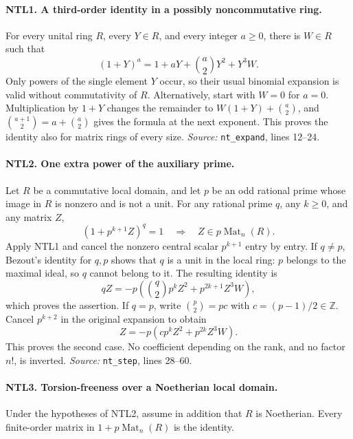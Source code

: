 \paragraph{NTL1. A third-order identity in a possibly noncommutative ring.}
\label{claim:NTL1}
For every unital ring \(R\), every \(Y\in R\), and every integer
\(a\ge0\), there is \(W\in R\) such that
\begin{equation}\label{eq:ntl-expand}
 (1+Y)^a=1+aY+\binom a2Y^2+Y^3W.
\end{equation}
Only powers of the single element \(Y\) occur, so their usual binomial
expansion is valid without commutativity of \(R\).  Alternatively,
start with \(W=0\) for \(a=0\).  Multiplication by \(1+Y\) changes the
remainder to \(W(1+Y)+\binom a2\), and
\(\binom{a+1}2=a+\binom a2\) gives the formula at the next exponent.
This proves the identity also for matrix rings of every size.
\emph{Source:} \texttt{nt\_expand}, lines 12--24.

\paragraph{NTL2. One extra power of the auxiliary prime.}
\label{claim:NTL2}
Let \(R\) be a commutative local domain, and let \(p\) be an odd
rational prime whose image in \(R\) is nonzero and is not a unit.
For any rational prime \(q\), any \(k\ge0\), and any matrix \(Z\),
\[
 (1+p^{k+1}Z)^q=1\quad\Longrightarrow\quad
                    Z\in p\operatorname{Mat}_n(R).
\]
Apply NTL1 and cancel the nonzero central scalar \(p^{k+1}\)
entry by entry.  If \(q\ne p\), Bezout's identity for \(q,p\) shows
that \(q\) is a unit in the local ring: \(p\) belongs to the maximal
ideal, so \(q\) cannot belong to it.  The resulting identity is
\[
 qZ=-p\left(\binom q2p^kZ^2+p^{2k+1}Z^3W\right),
\]
which proves the assertion.  If \(q=p\), write
\(\binom p2=pc\) with \(c=(p-1)/2\in\mathbb Z\).
Cancel \(p^{k+2}\) in the original expansion to obtain
\[
 Z=-p\left(cp^kZ^2+p^{2k}Z^3W\right).
\]
This proves the second case.  No coefficient depending on the rank,
and no factor \(n!\), is inverted.
\emph{Source:} \texttt{nt\_step}, lines 28--60.

\paragraph{NTL3. Torsion-freeness over a Noetherian local domain.}
\label{claim:NTL3}
Under the hypotheses of NTL2, assume in addition that \(R\) is
Noetherian.  Every finite-order matrix in
\(1+p\operatorname{Mat}_n(R)\) is the identity.

